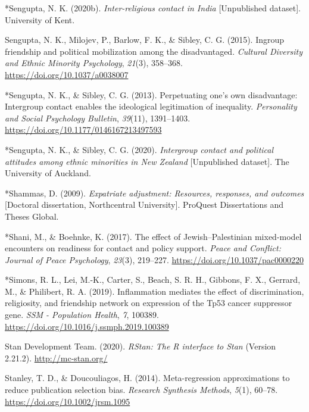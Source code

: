 \documentclass[12pt, letterpaper]{article}
\begin{document}
\leavevmode\hypertarget{ref-2385}{}%
*Sengupta, N. K. (2020b). \emph{Inter-religious contact in India}
{[}Unpublished dataset{]}. University of Kent.

\leavevmode\hypertarget{ref-sengupta_ingroup_2015}{}%
Sengupta, N. K., Milojev, P., Barlow, F. K., \& Sibley, C. G. (2015).
Ingroup friendship and political mobilization among the disadvantaged.
\emph{Cultural Diversity and Ethnic Minority Psychology}, \emph{21}(3),
358--368. \url{https://doi.org/10.1037/a0038007}

\leavevmode\hypertarget{ref-1695}{}%
*Sengupta, N. K., \& Sibley, C. G. (2013). Perpetuating one's own
disadvantage: Intergroup contact enables the ideological legitimation of
inequality. \emph{Personality and Social Psychology Bulletin},
\emph{39}(11), 1391--1403.
\url{https://doi.org/10.1177/0146167213497593}

\leavevmode\hypertarget{ref-2381}{}%
*Sengupta, N. K., \& Sibley, C. G. (2020). \emph{Intergroup contact and
political attitudes among ethnic minorities in New Zealand}
{[}Unpublished dataset{]}. The University of Auckland.

\leavevmode\hypertarget{ref-1891}{}%
*Shammas, D. (2009). \emph{Expatriate adjustment: Resources, responses,
and outcomes} {[}Doctoral dissertation, Northcentral University{]}.
ProQuest Dissertations and Theses Global.

\leavevmode\hypertarget{ref-789}{}%
*Shani, M., \& Boehnke, K. (2017). The effect of Jewish--Palestinian
mixed-model encounters on readiness for contact and policy support.
\emph{Peace and Conflict: Journal of Peace Psychology}, \emph{23}(3),
219--227. \url{https://doi.org/10.1037/pac0000220}

\leavevmode\hypertarget{ref-3060}{}%
*Simons, R. L., Lei, M.-K., Carter, S., Beach, S. R. H., Gibbons, F. X.,
Gerrard, M., \& Philibert, R. A. (2019). Inflammation mediates the
effect of discrimination, religiosity, and friendship network on
expression of the Tp53 cancer suppressor gene. \emph{SSM - Population
Health}, \emph{7}, 100389.
\url{https://doi.org/10.1016/j.ssmph.2019.100389}

\leavevmode\hypertarget{ref-stan_development_team_rstan:_2020}{}%
Stan Development Team. (2020). \emph{RStan: The R interface to Stan}
(Version 2.21.2). \url{http://mc-stan.org/}

\leavevmode\hypertarget{ref-stanley_meta-regression_2014}{}%
Stanley, T. D., \& Doucouliagos, H. (2014). Meta-regression
approximations to reduce publication selection bias. \emph{Research
Synthesis Methods}, \emph{5}(1), 60--78.
\url{https://doi.org/10.1002/jrsm.1095}
\end{document}
